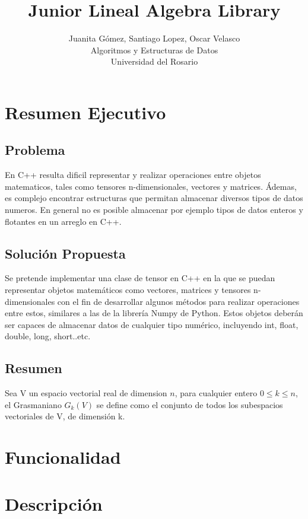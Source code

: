 \documentclass{article}
\title{Junior Lineal Algebra Library}
\author{Juanita Gómez, Santiago Lopez, Oscar Velasco\\
  \small Algoritmos y Estructuras de Datos\\
  \small Universidad del Rosario\\
}
\begin{document}
\maketitle

\setmarginsrb{35mm}{20mm}{25mm}{15mm}{12pt}{11mm}{0pt}{11mm}



\section{Resumen Ejecutivo}

\subsection{Problema}
En C++ resulta dificil representar y realizar operaciones entre objetos matematicos, tales como tensores n-dimensionales, vectores y matrices. Ádemas, es complejo encontrar estructuras que permitan almacenar diversos tipos de datos numeros. En general no es posible almacenar por ejemplo tipos de datos enteros y flotantes en un arreglo en C++.

\subsection{Solución Propuesta}
Se pretende implementar una clase de tensor en C++ en la que se puedan representar objetos matemáticos como vectores, matrices y tensores n-dimensionales con el fin de desarrollar algunos métodos para realizar operaciones entre estos, similares a las de la librería Numpy de Python. Estos objetos deberán ser capaces de almacenar datos de cualquier tipo numérico, incluyendo int, float, double, long, short..etc.

\subsection{Resumen}
Sea V un espacio vectorial real de dimension $n$, para cualquier entero $0 \leq k \leq n$, el Grasmaniano $G_k(V)$ se define como el conjunto de todos los subespacios vectoriales de V, de dimensión k. 
\section{Funcionalidad}
\section{Descripción}
\end{document}
